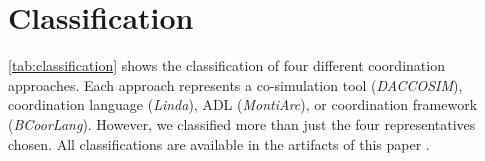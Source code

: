 \documentclass[runningheads]{llncs}
\begin{document}
\section{Classification} \label{sec:classifications}
\autoref{tab:classification} shows the classification of four different coordination approaches.
Each approach represents a co-simulation tool (\textit{DACCOSIM}), coordination language (\textit{Linda}), ADL (\textit{MontiArc}), or coordination framework (\textit{BCoorLang}).
However, we classified more than just the four representatives chosen.
All classifications are available in the artifacts of this paper \cite{timkrauterArtifactsCoordination2024}.

\end{document}
